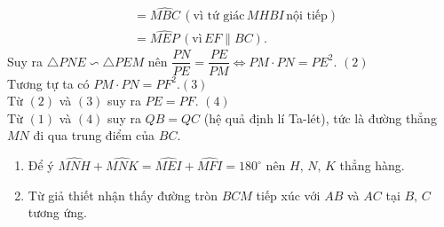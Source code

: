 \begin{bt}
{{\begin{align*}
&=\widehat{MBC} \, (\text{vì tứ giác}\, MHBI\, \text{nội tiếp})\\
&=\widehat{MEP}\, (\text{vì}\, EF\parallel BC).
\end{align*}}Suy ra $\triangle PNE \backsim \triangle PEM $ nên $\dfrac{PN}{PE}=\dfrac{PE}{PM}\Leftrightarrow PM\cdot PN=PE^2$. \hfill$(2)$\\
Tương tự ta có $PM\cdot PN=PF^2$.\hfill$(3)$\\
Từ $(2)$ và $(3)$ suy ra $PE=PF$. \hfill$(4)$\\
Từ $(1)$ và $(4)$ suy ra $QB=QC$ (hệ quả định lí Ta-lét), tức là đường thẳng $MN$ đi qua trung điểm của $BC$.
\begin{nx}\hfill
\begin{enumerate}
\item Để ý $\widehat{MNH}+\widehat{MNK}=\widehat{MEI}+\widehat{MFI}=180^{\circ}$ nên $H,\,N,\,K$ thẳng hàng.
\item Từ giả thiết nhận thấy đường tròn $BCM$ tiếp xúc với $AB$ và $AC$ tại $B,\, C$ tương ứng.
\end{enumerate}
\end{nx}
}
\end{bt}

